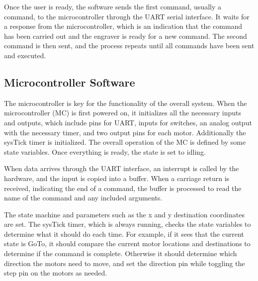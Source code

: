 \documentclass[11pt]{LaTeX-Classes/math-hw}
\begin{document}
Once the user is ready, the software sends the first command, usually a  command, to the
microcontroller through the UART serial interface.
It waits for a response from the microcontroller, which is an indication that the command has been
carried out and the engraver is ready for a new command.
The second command is then sent, and the process repeats until all commands have been sent and executed.

\subsection{Microcontroller Software}
The microcontroller is key for the functionality of the overall system.
When the microcontroller (MC) is first powered on, it initializes all the necessary inputs and outputs,
which include pins for UART, inputs for switches, an analog output with the necessary timer,
and two output pins for each motor.
Additionally the sysTick timer is initialized. The overall operation of the MC is defined by some
state variables. Once everything is ready, the state is set to idling.

When data arrives through the UART interface, an interrupt is called by the hardware, and the
input is copied into a buffer. When a carriage return is received, indicating the end of a command,
the buffer is processed to read the name of the command and any included arguments.

The state machine and parameters such as the x and y destination coordinates are set.
The sysTick timer, which is always running, checks the state variables to determine what it should
do each time. For example, if it sees that the current state is GoTo, it should compare the current
motor locations and destinations to determine if the command is complete. Otherwise it should
determine which direction the motors need to move, and set the direction pin while toggling
the step pin on the motors as needed.

\end{document}
